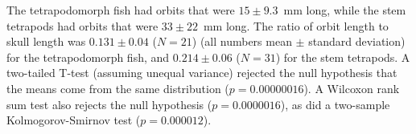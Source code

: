  The tetrapodomorph fish had orbits that were $15 \pm 9.3$~mm long, while the stem tetrapods had orbits that were $33 \pm 22$~mm long. The ratio of orbit length to skull length was $0.131 \pm 0.04$  ($N=21$) (all numbers mean $\pm$ standard deviation) for the tetrapodomorph fish, and $0.214 \pm  0.06$ ($N=31$) for the stem tetrapods. A two-tailed  T-test (assuming unequal variance) rejected the null hypothesis that the means come from the same distribution ($p = 0.00000016$). A Wilcoxon rank sum test also rejects the null hypothesis ($p = 0.0000016$), as did a two-sample Kolmogorov-Smirnov test ($p = 0.000012$). 